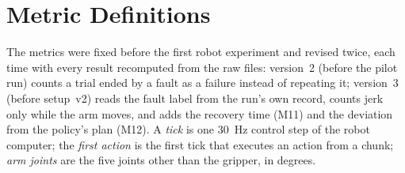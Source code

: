 \chapter{Metric Definitions}\label{app:metrics}

The metrics were fixed before the first robot experiment and revised twice, each time with every result recomputed from
the raw files: version~2 (before the pilot run) counts a trial ended by a fault as a failure instead of repeating it;
version~3 (before setup~v2) reads the fault label from the run's own record, counts jerk only while the arm moves, and
adds the recovery time (M11) and the deviation from the policy's plan (M12). A \emph{tick} is one 30~Hz control step of
the robot computer; the \emph{first action} is the first tick that executes an action from a chunk; \emph{arm joints}
are the five joints other than the gripper, in degrees.

